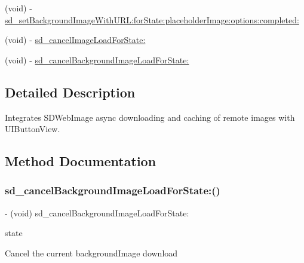 \begin{DoxyCompactItemize}
\item 
(void) -\/ \mbox{\hyperlink{category_u_i_button_07_web_cache_08_a02dc89ea855c63ac6fdbc7595f13e577}{sd\+\_\+set\+Background\+Image\+With\+U\+R\+L\+:for\+State\+:placeholder\+Image\+:options\+:completed\+:}}
\item 
(void) -\/ \mbox{\hyperlink{category_u_i_button_07_web_cache_08_a29cb6b84260cc685f2b6d7c746a014d8}{sd\+\_\+cancel\+Image\+Load\+For\+State\+:}}
\item 
(void) -\/ \mbox{\hyperlink{category_u_i_button_07_web_cache_08_a1212bebc5d1a52a7e898c96fd128191d}{sd\+\_\+cancel\+Background\+Image\+Load\+For\+State\+:}}
\end{DoxyCompactItemize}


\subsection{Detailed Description}
Integrates S\+D\+Web\+Image async downloading and caching of remote images with U\+I\+Button\+View. 

\subsection{Method Documentation}
\mbox{\label{category_u_i_button_07_web_cache_08_a1212bebc5d1a52a7e898c96fd128191d}} 
\subsubsection{\texorpdfstring{sd\+\_\+cancel\+Background\+Image\+Load\+For\+State\+:()}{sd\_cancelBackgroundImageLoadForState:()}\hspace{0.1cm}{\footnotesize\ttfamily [1/3]}}
{\footnotesize\ttfamily -\/ (void) sd\+\_\+cancel\+Background\+Image\+Load\+For\+State\+: \begin{DoxyParamCaption}\item[{(U\+I\+Control\+State)}]{state }\end{DoxyParamCaption}}

Cancel the current background\+Image download \mbox{\label{category_u_i_button_07_web_cache_08_a1212bebc5d1a52a7e898c96fd128191d}} 
